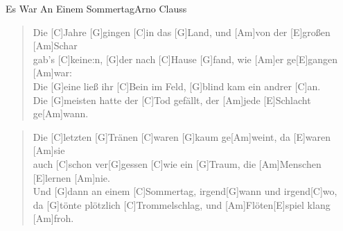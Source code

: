 \begin{song}{Es War An Einem Sommertag}{Arno Clauss}

    \begin{verse}  
        Die [C]Jahre [G]gingen [C]in das [G]Land, und [Am]von der [E]großen [Am]Schar \\
        gab’s [C]keine:n, [G]der nach [C]Hause [G]fand, wie [Am]er ge[E]gangen [Am]war: \\
        Die [G]eine ließ ihr [C]Bein im Feld, [G]blind kam ein andrer [C]an. \\
        Die [G]meisten hatte der [C]Tod gefällt, der [Am]jede [E]Schlacht ge[Am]wann.
    \end{verse}  


    \begin{verse}  
        Die [C]letzten [G]Tränen [C]waren [G]kaum ge[Am]weint, da [E]waren [Am]sie \\
        auch [C]schon ver[G]gessen [C]wie ein [G]Traum, die [Am]Menschen [E]lernen [Am]nie. \\
        Und [G]dann an einem [C]Sommertag, irgend[G]wann und irgend[C]wo, \\
        da [G]tönte plötzlich [C]Trommelschlag, und [Am]Flöten[E]spiel klang [Am]froh.
    \end{verse}  


\end{song}
